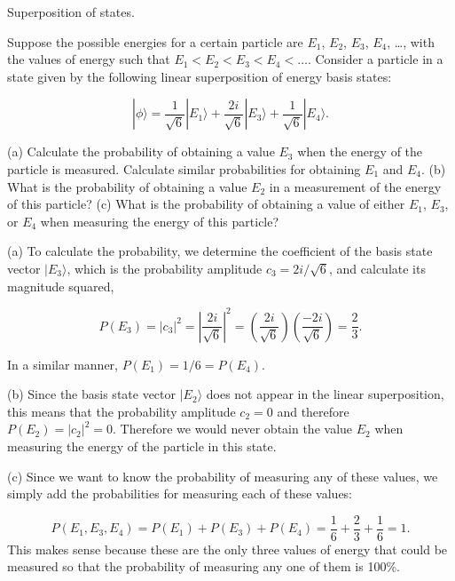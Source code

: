 \begin{example}{Superposition of states.}
\label{examp:Super}

Suppose the possible energies for a certain particle are $E_1$,
$E_2$,  $E_3$, $E_4$, \dots, with the values of energy such that $E_1 <
E_2 < E_3 < E_4 < \ldots $.  Consider a particle in a state given by
the following linear superposition of energy basis states:

\begin{equation}
|\mbox{$\phi$}\rangle = \frac{1}{\sqrt{6}} |\mbox{$E_1$}\rangle + \frac{2 i}{\sqrt{6}} |\mbox{$E_3$}\rangle + \frac{1}{\sqrt{6}} |\mbox{$E_4$}\rangle .
\end{equation}

(a) Calculate the probability of obtaining a value $E_3$ when the energy
of the particle is measured.  Calculate similar probabilities for
obtaining $E_1$ and $E_4$.  (b) What is the probability of obtaining
a value $E_2$ in a measurement of the energy of this particle?  (c)
What is the probability of obtaining a value of either $E_1$, $E_3$,
or $E_4$ when measuring the energy of this particle?

\begin{solution}
(a) To calculate the probability, we determine the coefficient of the
basis state vector $|\mbox{$E_3$}\rangle$, which is the
probability amplitude $c_3 = 2i/\sqrt{6}$, and calculate its magnitude
squared,

\begin{equation} \nonumber
P(E_3) = |c_3|^2 = \left|\frac{2 i}{\sqrt{6}}\right|^2 = \left(\frac{2 i}{\sqrt{6}}\right) \left(\frac{-2 i}{\sqrt{6}} \right) = \frac{2}{3} .
\end{equation}

\noindent In a similar manner, $P(E_1) = 1/6 = P(E_4)$.

(b) Since the basis state vector $|\mbox{$E_2$}\rangle$ does not appear in
the linear superposition, this means that the probability amplitude $c_2 =
0$ and therefore $P(E_2) = |c_2|^2 = 0$.  Therefore we would never obtain
the value $E_2$ when measuring the energy of the particle in this state.

(c) Since we want to know the probability of measuring any of these
values, we simply add the probabilities for measuring each of these
values:

\begin{equation} \nonumber
P(E_1, E_3, E_4) = P(E_1) + P(E_3) + P(E_4) = \frac{1}{6} + \frac{2}{3} + \frac{1}{6} = 1 .
\end{equation}
This makes sense because these are the only three values of energy that
could be measured so that the probability of measuring any one of them
is 100\%.

\end{solution}
\end{example}

